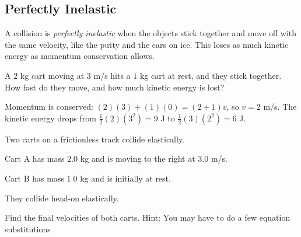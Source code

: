\subsection{Perfectly Inelastic}
A collision is \emph{perfectly inelastic} when the objects stick together and move off with the same
velocity, like the putty and the cars on ice. This loses as much kinetic
energy as momentum conservation allows.

\begin{Worked}
\begin{Problem}
A $2$ kg cart moving at $3$ m/s hits a $1$ kg cart
at rest, and they stick together. How fast do they move, and how much
kinetic energy is lost?
\end{Problem}
\begin{Solution}
Momentum is conserved:
$(2)(3) + (1)(0) = (2 + 1)v$, so $v = 2$ m/s. The kinetic energy drops from
$\frac{1}{2}(2)(3^2) = 9$ J to $\frac{1}{2}(3)(2^2) = 6$ J.
\end{Solution}
\end{Worked}


\begin{Exercise}[title={Two Carts}, label=carts_elastic]
Two carts on a frictionless track collide elastically.

Cart A has mass $2.0$ kg and is moving to the right at $3.0$ m/s.

Cart B has mass $1.0$ kg and is initially at rest.

They collide head-on elastically.

Find the final velocities of both carts. Hint: You may have to do a few equation substitutions
\end{Exercise}


